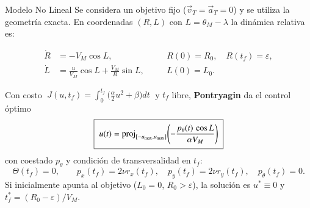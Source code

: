 \begin{block}{Modelo No Lineal}
	Se considera un objetivo fijo ($\vec v_T=\vec a_T=0$) y se utiliza la geometría exacta. En coordenadas
	$(R,L)$ con $L=\theta_M-\lambda$ la dinámica relativa es:
	
	\vspace{-0.9cm}
	$$
	\begin{aligned}
	\dot R&= -V_M\cos L, &\quad& R(0)=R_0,\quad R(t_f)=\varepsilon,\\
	\dot L&= \frac{u}{V_M}\cos L+\frac{V_M}{R}\sin L, &\quad& L(0)=L_0.
	\end{aligned}
	$$

	\vspace{1.5cm}
	
	\begin{exampleblock}{}
	Con costo $\;J(u,t_f)=\int_0^{t_f}\!\big(\tfrac{\alpha}{2}u^2+\beta\big)dt\;$
	y $t_f$ libre, \textbf{Pontryagin} da el control óptimo
	$$
	\boxed{\;\vphantom{\frac{\frac{A}{B}}{\frac{C}{D}}}
	u(t)=\operatorname{proj}_{[-u_{\max},u_{\max}]}
	\!\left(-\frac{p_\theta(t)\,\cos L}{\alpha V_M}\right)\;}
	$$
	con coestado $p_\theta$ y condición de transversalidad en $t_f$:
	$$
	\Theta(t_f)=0,\qquad p_x(t_f)=2\nu r_x(t_f),\quad p_y(t_f)=2\nu r_y(t_f),\quad p_\theta(t_f)=0.
	$$
	Si inicialmente apunta al objetivo ($L_0=0$, $R_0>\varepsilon$), la solución es $u^*\equiv0$ y
	$t_f^*=(R_0-\varepsilon)/V_M$.
	\end{exampleblock}
	{\def\marginimagetop{-2}
	}
\end{block}

\separatorcolumn

